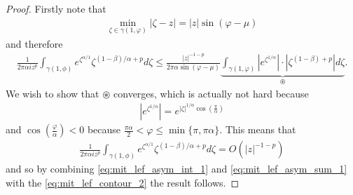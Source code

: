\begin{proof}
    Firstly note that
    \begin{align}
        \min_{\zeta \in \gamma(1, \varphi)} |\zeta - z| = |z|\sin(\varphi - \mu)
    \end{align}
    and therefore
    \begin{align}
        \label{eq:mit_lef_contour_int_conv}
        \frac{1}{2\pi\alpha i z^p} \int_{\gamma(1,\phi)} e^{\zeta^{\alpha / 1}} \zeta^{(1-\beta)/\alpha + p} d\zeta \leq \frac{|z|^{-1-p}}{2\pi\alpha\sin(\varphi - \mu)} \underbrace{\int_{\gamma(1,\varphi)} \left| e^{\zeta^{1/\alpha}} \right| \cdot \left| \zeta^{(1-\beta)+p}\right| d\zeta}_{\circledast}.
    \end{align}
We wish to show that $ \circledast $ converges, which is actually not hard because 
\begin{align}
    \left| e^{\zeta^{1/\alpha}}\right| = e^{|\zeta|^{1/\alpha} \cos\left(\frac{\pi}{\alpha}\right)}
\end{align}
and $ \cos\left(\frac{\varphi}{\alpha}\right) < 0 $ because $ \frac{\pi \alpha}{2} < \varphi \leq \min\{\pi, \pi \alpha\} $. 
This means that 
\begin{align}
    \label{eq:mit_lef_asym_int_1}
    \frac{1}{2\pi\alpha i z^p} \int_{\gamma(1,\phi)} e^{\zeta^{\alpha / 1}} \zeta^{(1-\beta)/\alpha + p} d\zeta = O(|z|^{-1-p})
\end{align}
and so by combining \eqref{eq:mit_lef_asym_int_1} and \eqref{eq:mit_lef_asym_sum_1} with the \eqref{eq:mit_lef_contour_2} the result follows.
\end{proof}

\clearpage
